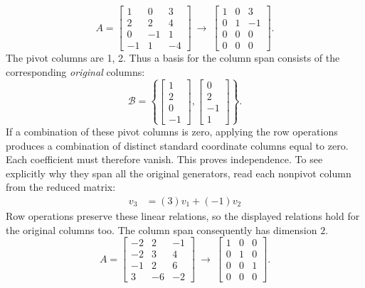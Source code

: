 \[A=\left[\begin{array}{rrr}1&0&3\\2&2&4\\0&-1&1\\-1&1&-4\end{array}\right]\ \longrightarrow\ \left[\begin{array}{rrr}1&0&3\\0&1&-1\\0&0&0\\0&0&0\end{array}\right].\]
The pivot columns are 1, 2. Thus a basis for the column span consists of the corresponding \emph{original} columns:
\[\mathcal B=\left\{\left[\begin{array}{r}1\\2\\0\\-1\end{array}\right],\left[\begin{array}{r}0\\2\\-1\\1\end{array}\right]\right\}.\]
If a combination of these pivot columns is zero, applying the row operations produces a combination of distinct standard coordinate columns equal to zero. Each coefficient must therefore vanish. This proves independence. To see explicitly why they span all the original generators, read each nonpivot column from the reduced matrix:
\[\begin{aligned}v_{3}&=(3)v_{1}+(-1)v_{2}\end{aligned}\]
Row operations preserve these linear relations, so the displayed relations hold for the original columns too. The column span consequently has dimension $2$.
\[A=\left[\begin{array}{rrr}-2&2&-1\\-2&3&4\\-1&2&6\\3&-6&-2\end{array}\right]\ \longrightarrow\ \left[\begin{array}{rrr}1&0&0\\0&1&0\\0&0&1\\0&0&0\end{array}\right].\]
